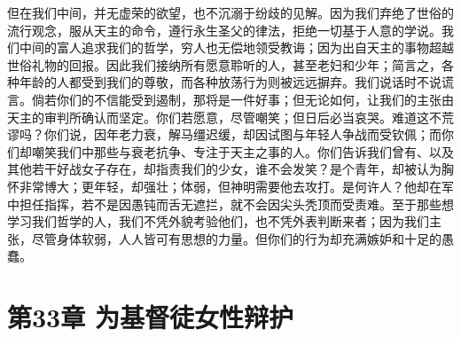 但在我们中间，并无虚荣的欲望，也不沉溺于纷歧的见解。因为我们弃绝了世俗的流行观念，服从天主的命令，遵行永生圣父的律法，拒绝一切基于人意的学说。我们中间的富人追求我们的哲学，穷人也无偿地领受教诲；因为出自天主的事物超越世俗礼物的回报。因此我们接纳所有愿意聆听的人，甚至老妇和少年；简言之，各种年龄的人都受到我们的尊敬，而各种放荡行为则被远远摒弃。我们说话时不说谎言。倘若你们的不信能受到遏制，那将是一件好事；但无论如何，让我们的主张由天主的审判所确认而坚定。你们若愿意，尽管嘲笑；但日后必当哀哭。难道这不荒谬吗？你们说，因年老力衰，解马缰迟缓，却因试图与年轻人争战而受钦佩；而你们却嘲笑我们中那些与衰老抗争、专注于天主之事的人。你们告诉我们曾有、以及其他若干好战女子存在，却指责我们的少女，谁不会发笑？是个青年，却被认为胸怀非常博大；更年轻，却强壮；体弱，但神明需要他去攻打。是何许人？他却在军中担任指挥，若不是因愚钝而舌无遮拦，就不会因尖头秃顶而受责难。至于那些想学习我们哲学的人，我们不凭外貌考验他们，也不凭外表判断来者；因为我们主张，尽管身体软弱，人人皆可有思想的力量。但你们的行为却充满嫉妒和十足的愚蠢。\par


\section{第33章 为基督徒女性辩护}

